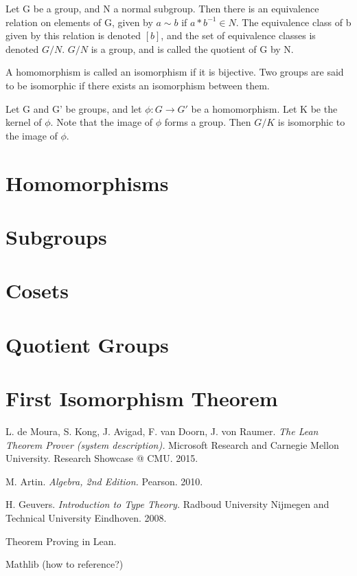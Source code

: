 \documentclass[runningheads,a4paper]{llncs}
\renewcommand{\-}{\setminus}
\begin{document}
\begin{definition}
Let G be a group, and N a normal subgroup. Then there is an equivalence relation on elements of G, given by $a \sim b$ if $a * b^{-1} \in N$. The equivalence class of b given by this relation is denoted $[b]$, and the set of equivalence classes is denoted $G/N$. $G/N$ is a group, and is called the quotient of G by N.
\end{definition}

\begin{definition}[Isomorphism]
A homomorphism is called an isomorphism if it is bijective. Two groups are said to be isomorphic if there exists an isomorphism between them.
\end{definition}

\begin{theorem}
Let G and G' be groups, and let $\phi : G \to G'$ be a homomorphism. Let K be the kernel of $\phi$. Note that the image of $\phi$ forms a group. Then $G/K$ is isomorphic to the image of $\phi$.
\end{theorem}


\section{Homomorphisms}

\section{Subgroups}

\section{Cosets}

\section{Quotient Groups}

\section{First Isomorphism Theorem}


\begin{thebibliography}{1}

 L. de Moura, S. Kong, J. Avigad, F. van Doorn, J. von Raumer. {\em The Lean Theorem Prover (system description).} Microsoft Research and Carnegie Mellon University. Research Showcase @ CMU. 2015.

 M. Artin. {\em Algebra, 2nd Edition.} Pearson. 2010.

 H. Geuvers. {\em Introduction to Type Theory.} Radboud University Nijmegen and Technical University Eindhoven. 2008.

 Theorem Proving in Lean.

 Mathlib (how to reference?)

\end{thebibliography}
\end{document}
